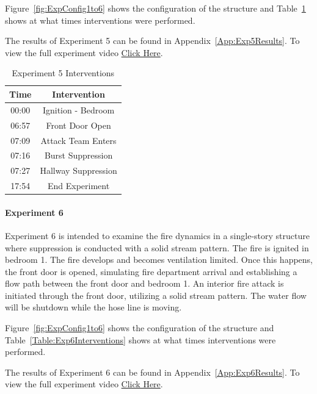 \documentclass[12pt,oneside]{book}
\begin{document}
Figure~\ref{fig:ExpConfig1to6} shows the configuration of the structure and Table~\ref{Table:Exp5Interventions} shows at what times interventions were performed. 

The results of Experiment 5 can be found in Appendix~\ref{App:Exp5Results}. To view the full experiment video \href{https://youtu.be/gl8rc1Nsl1k}{Click Here}.

\begin{table}[H]
	\centering
	\caption{Experiment 5 Interventions}
	\begin{tabular}{|c|c|} 
		\hline
		Time & Intervention \\ \hline \hline
		00:00 & Ignition - Bedroom \\ \hline
		06:57 & Front Door Open \\ \hline
		07:09 & Attack Team Enters\\ \hline
		07:16 & Burst Suppression \\ \hline 
		07:27 & Hallway Suppression \\ \hline
		17:54 & End Experiment\\ \hline
	\end{tabular}
	\label{Table:Exp5Interventions}
\end{table}

\clearpage

\paragraph{Experiment 6} \mbox{}

Experiment 6 is intended to examine the fire dynamics in a single-story structure where suppression is conducted with a solid stream pattern. The fire is ignited in bedroom 1. The fire develops and becomes ventilation limited. Once this happens, the front door is opened, simulating fire department arrival and establishing a flow path between the front door and bedroom 1. An interior fire attack is initiated through the front door, utilizing a solid stream pattern. The water flow will be shutdown while the hose line is moving. 

Figure~\ref{fig:ExpConfig1to6} shows the configuration of the structure and Table~\ref{Table:Exp6Interventions} shows at what times interventions were performed. 

The results of Experiment 6 can be found in Appendix~\ref{App:Exp6Results}. To view the full experiment video \href{https://youtu.be/gl8rc1Nsl1k}{Click Here}.
\end{document}
